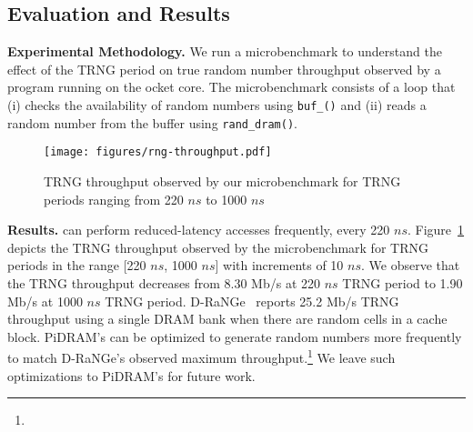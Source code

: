 \subsection{Evaluation and Results}
\label{sec:drange-evaluation}
\textbf{Experimental Methodology.} We run a microbenchmark to understand the effect of the TRNG period on true random number  throughput observed by a program running on the ocket core. The microbenchmark consists of a loop that (i) checks the availability of random numbers using \texttt{buf\_()} and (ii) reads a random number from the buffer using \texttt{rand\_dram()}.  

\begin{figure}[!ht]
  \centering
  \vspace{-5mm}
  \texttt{[image: figures/rng-throughput.pdf]}
  \vspace{-3mm}
  \caption{TRNG throughput observed by our microbenchmark for TRNG periods ranging from 220 $ns$ to 1000 $ns$}
  \label{fig:trng-throughput}
\end{figure}

\noindent
\textbf{Results.}  can perform reduced-latency accesses frequently, every 220 $ns$. Figure~\ref{fig:trng-throughput} depicts the TRNG throughput observed by the microbenchmark for TRNG periods in the range [220 $ns$, 1000 $ns$] with increments of 10 $ns$. We observe that the TRNG throughput decreases from 8.30 Mb/s at 220 $ns$ TRNG period to 1.90 Mb/s at 1000 $ns$ TRNG period. D-RaNGe~\cite{kim.hpca19} reports 25.2 Mb/s TRNG throughput using a single DRAM bank when there are  random cells in a cache block. PiDRAM's  can be optimized to generate random numbers more frequently to match D-RaNGe's observed maximum throughput.\footnote{} We leave such optimizations to PiDRAM's  for future work.


